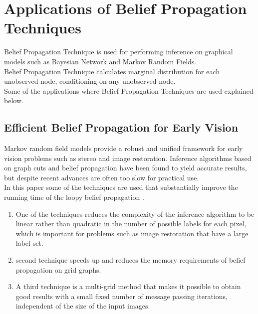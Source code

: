 \chapter{\textbf{Applications of Belief Propagation Techniques}}
Belief Propagation Technique is used for performing inference on graphical models such as Bayesian Network and Markov Random Fields.\\Belief Propagation Technique calculates marginal distribution for each unobserved node, conditioning on any unobserved node.\\Some of the applications where Belief Propagation Techniques are used explained below.

\section{Efficient Belief Propagation for Early Vision}

Markov random field models provide a robust and unified framework for early vision problems such as stereo and image restoration. Inference algorithms based on graph cuts and belief propagation have been found to yield accurate results, but despite recent advances are often too slow for practical use.\\ In this paper some of the techniques  are used that substantially improve the running time of the loopy belief propagation .
\begin{enumerate}
  \item One of the techniques reduces the complexity of the inference algorithm to be linear rather than quadratic in the number of possible labels for each pixel, which is important for problems such as image restoration that have a large label set.
  \item second  technique speeds up and reduces the memory requirements of belief propagation on grid graphs.
  \item  A third technique is a multi-grid method that makes it possible to obtain good results with a small fixed number of message passing iterations, independent of the size of the input images.
\end{enumerate}


